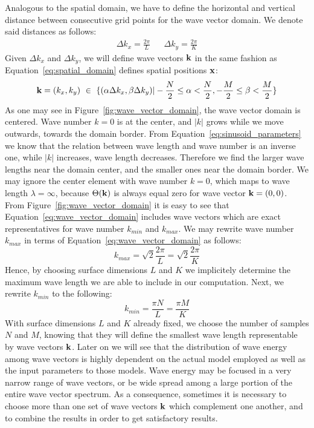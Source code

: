 %
Analogous to the spatial domain, we have to define the horizontal and vertical 
distance between consecutive grid points for the wave vector domain. We denote 
said distances as follows:
\begin{align}
\label{eq:delta_kx_delta_ky}
 \Delta k_x = \frac{2\pi}{L} && \Delta k_y = \frac{2\pi}{K}
\end{align}
%
Given $\Delta k_x$ and $\Delta k_y$, we will define wave vectors $\mathbf{k}$ in 
the same fashion as Equation~\ref{eq:spatial_domain} defines spatial positions 
$\mathbf{x}$:
\begin{equation}
\label{eq:wave_vector_domain}
 \mathbf{k} = (k_x,k_y)~\in~\{(\alpha\Delta k_x,\beta\Delta k_y)|
-\frac{N}{2}\leq\alpha<\frac{N}{2},-\frac{M}{2}\leq\beta<\frac{M}{2}\}
\end{equation}
%
As one may see in Figure~\ref{fig:wave_vector_domain}, the wave vector domain 
is centered. Wave number $k = 0$ is at the center, and $|k|$ grows while we 
move outwards, towards the domain border. From
Equation~\ref{eq:sinusoid_parameters} we know that the relation between wave 
length and wave number is an inverse one, while $|k|$ increases, wave length 
decreases. Therefore we find the larger wave lengths near the domain center, 
and the smaller ones near the domain border. We may ignore the center element 
with wave number $k = 0$, which maps to wave length $\lambda = \infty$, because 
$\Theta(\mathbf{k})$ is always equal zero for wave vector $\mathbf{k} = (0, 0)$.\\

From Figure~\ref{fig:wave_vector_domain} it is easy to see that  
Equation~\ref{eq:wave_vector_domain} includes wave vectors which are exact 
representatives for wave number $k_{min}$ and $k_{max}$. We may rewrite wave 
number $k_{max}$ in terms of Equation~\ref{eq:wave_vector_domain} as follows:
\begin{equation}
 k_{max} = \sqrt{2}\frac{2\pi}{L} = \sqrt{2}\frac{2\pi}{K}
\end{equation}
Hence, by choosing surface dimensions $L$ and $K$ we implicitely determine the 
maximum wave length we are able to include in our computation. Next, we rewrite 
$k_{min}$ to the following:
\begin{equation}
 k_{min} = \frac{\pi N}{L} = \frac{\pi M}{K}
\end{equation}
With surface dimensions $L$ and $K$ already fixed, we choose the number of 
samples $N$ and $M$, knowing that they will define the smallest wave length 
representable by wave vectors $\mathbf{k}$. Later on we will see that the 
distribution of wave energy among wave vectors is highly dependent on the 
actual model employed as well as the input parameters to those models. Wave 
energy may be focused in a very narrow range of wave vectors, or be wide spread 
among a large portion of the entire wave vector spectrum. As a consequence, 
sometimes it is necessary to choose more than one set of wave vectors 
$\mathbf{k}$ which complement one another, and to combine the results in order 
to get satisfactory results.
